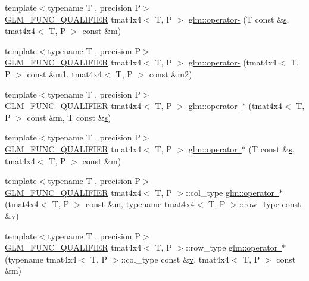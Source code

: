 \begin{DoxyCompactItemize}
\item 
{\footnotesize template$<$typename T , precision P$>$ }\\\mbox{\hyperlink{setup_8hpp_a33fdea6f91c5f834105f7415e2a64407}{G\+L\+M\+\_\+\+F\+U\+N\+C\+\_\+\+Q\+U\+A\+L\+I\+F\+I\+ER}} tmat4x4$<$ T, P $>$ \mbox{\hyperlink{namespaceglm_a24aba4a4b8f93adbdc8e6d301d713141}{glm\+::operator-\/}} (T const \&\mbox{\hyperlink{glad_8h_af1b1d5edfea6a34daee7389b1b5810ad}{s}}, tmat4x4$<$ T, P $>$ const \&m)
\item 
{\footnotesize template$<$typename T , precision P$>$ }\\\mbox{\hyperlink{setup_8hpp_a33fdea6f91c5f834105f7415e2a64407}{G\+L\+M\+\_\+\+F\+U\+N\+C\+\_\+\+Q\+U\+A\+L\+I\+F\+I\+ER}} tmat4x4$<$ T, P $>$ \mbox{\hyperlink{namespaceglm_a0533c5ac15cb344bc9a67803717c5300}{glm\+::operator-\/}} (tmat4x4$<$ T, P $>$ const \&m1, tmat4x4$<$ T, P $>$ const \&m2)
\item 
{\footnotesize template$<$typename T , precision P$>$ }\\\mbox{\hyperlink{setup_8hpp_a33fdea6f91c5f834105f7415e2a64407}{G\+L\+M\+\_\+\+F\+U\+N\+C\+\_\+\+Q\+U\+A\+L\+I\+F\+I\+ER}} tmat4x4$<$ T, P $>$ \mbox{\hyperlink{namespaceglm_a568164347c73a67904905038c652676a}{glm\+::operator $\ast$}} (tmat4x4$<$ T, P $>$ const \&m, T const \&\mbox{\hyperlink{glad_8h_af1b1d5edfea6a34daee7389b1b5810ad}{s}})
\item 
{\footnotesize template$<$typename T , precision P$>$ }\\\mbox{\hyperlink{setup_8hpp_a33fdea6f91c5f834105f7415e2a64407}{G\+L\+M\+\_\+\+F\+U\+N\+C\+\_\+\+Q\+U\+A\+L\+I\+F\+I\+ER}} tmat4x4$<$ T, P $>$ \mbox{\hyperlink{namespaceglm_a091f281916c679c282c30683220f4881}{glm\+::operator $\ast$}} (T const \&\mbox{\hyperlink{glad_8h_af1b1d5edfea6a34daee7389b1b5810ad}{s}}, tmat4x4$<$ T, P $>$ const \&m)
\item 
{\footnotesize template$<$typename T , precision P$>$ }\\\mbox{\hyperlink{setup_8hpp_a33fdea6f91c5f834105f7415e2a64407}{G\+L\+M\+\_\+\+F\+U\+N\+C\+\_\+\+Q\+U\+A\+L\+I\+F\+I\+ER}} tmat4x4$<$ T, P $>$\+::col\+\_\+type \mbox{\hyperlink{namespaceglm_ab7eb2048c86bdf1751206edc0266e587}{glm\+::operator $\ast$}} (tmat4x4$<$ T, P $>$ const \&m, typename tmat4x4$<$ T, P $>$\+::row\+\_\+type const \&\mbox{\hyperlink{glad_8h_a14cfbe2fc2234f5504618905b69d1e06}{v}})
\item 
{\footnotesize template$<$typename T , precision P$>$ }\\\mbox{\hyperlink{setup_8hpp_a33fdea6f91c5f834105f7415e2a64407}{G\+L\+M\+\_\+\+F\+U\+N\+C\+\_\+\+Q\+U\+A\+L\+I\+F\+I\+ER}} tmat4x4$<$ T, P $>$\+::row\+\_\+type \mbox{\hyperlink{namespaceglm_a6564719dbb5c66478628752d7a589c94}{glm\+::operator $\ast$}} (typename tmat4x4$<$ T, P $>$\+::col\+\_\+type const \&\mbox{\hyperlink{glad_8h_a14cfbe2fc2234f5504618905b69d1e06}{v}}, tmat4x4$<$ T, P $>$ const \&m)

\end{DoxyCompactItemize}
